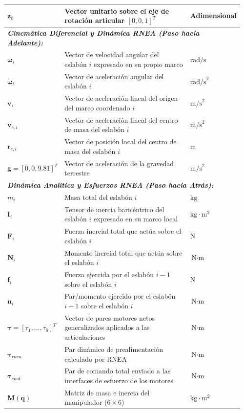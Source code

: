 \documentclass[12pt]{article}
\begin{document}
\begin{longtable}{p{0.20\linewidth} p{0.62\linewidth} p{0.14\linewidth}}
$\bm{z}_0$ & Vector unitario sobre el eje de rotación articular $[0, 0, 1]^T$ & Adimensional \\
\midrule
\multicolumn{3}{l}{\textit{\textbf{Cinemática Diferencial y Dinámica RNEA (Paso hacia Adelante):}}} \\
$\bm{\omega}_i$ & Vector de velocidad angular del eslabón $i$ expresado en su propio marco & $\text{rad/s}$ \\
$\dot{\bm{\omega}}_i$ & Vector de aceleración angular del eslabón $i$ & $\text{rad/s}^2$ \\
$\dot{\bm{v}}_i$ & Vector de aceleración lineal del origen del marco coordenado $i$ & $\text{m/s}^2$ \\
$\dot{\bm{v}}_{c,i}$ & Vector de aceleración lineal del centro de masa del eslabón $i$ & $\text{m/s}^2$ \\
$\bm{r}_{c,i}$ & Vector de posición local del centro de masa del eslabón $i$ & $\text{m}$ \\
$\bm{g} = [0, 0, 9.81]^T$ & Vector de aceleración de la gravedad terrestre & $\text{m/s}^2$ \\
\midrule
\multicolumn{3}{l}{\textit{\textbf{Dinámica Analítica y Esfuerzos RNEA (Paso hacia Atrás):}}} \\
$m_i$ & Masa total del eslabón $i$ & $\text{kg}$ \\
$\bm{I}_i$ & Tensor de inercia baricéntrico del eslabón $i$ expresado en su marco local & $\text{kg}\cdot\text{m}^2$ \\
$\bm{F}_i$ & Fuerza inercial total que actúa sobre el eslabón $i$ & $\text{N}$ \\
$\bm{N}_i$ & Momento inercial total que actúa sobre el eslabón $i$ & $\text{N}\cdot\text{m}$ \\
$\bm{f}_i$ & Fuerza ejercida por el eslabón $i-1$ sobre el eslabón $i$ & $\text{N}$ \\
$\bm{n}_i$ & Par/momento ejercido por el eslabón $i-1$ sobre el eslabón $i$ & $\text{N}\cdot\text{m}$ \\
$\bm{\tau} = [\tau_1, \dots, \tau_6]^T$ & Vector de pares motores netos generalizados aplicados a las articulaciones & $\text{N}\cdot\text{m}$ \\
$\bm{\tau}_{rnea}$ & Par dinámico de prealimentación calculado por RNEA & $\text{N}\cdot\text{m}$ \\
$\bm{\tau}_{cmd}$ & Par de comando total enviado a las interfaces de esfuerzo de los motores & $\text{N}\cdot\text{m}$ \\
$\bm{M}(\bm{q})$ & Matriz de masa e inercia del manipulador ($6 \times 6$) & $\text{kg}\cdot\text{m}^2$ \\

\end{longtable}
\end{document}
